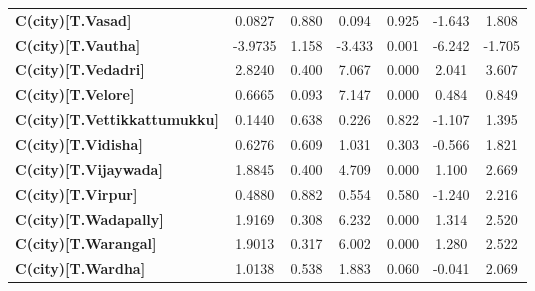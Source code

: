\begin{center}
\begin{tabular}{lcccccc}
\textbf{C(city)[T.Vasad]}                                                                           &       0.0827  &        0.880     &     0.094  &         0.925        &       -1.643    &        1.808     \\
\textbf{C(city)[T.Vautha]}                                                                          &      -3.9735  &        1.158     &    -3.433  &         0.001        &       -6.242    &       -1.705     \\
\textbf{C(city)[T.Vedadri]}                                                                         &       2.8240  &        0.400     &     7.067  &         0.000        &        2.041    &        3.607     \\
\textbf{C(city)[T.Velore]}                                                                          &       0.6665  &        0.093     &     7.147  &         0.000        &        0.484    &        0.849     \\
\textbf{C(city)[T.Vettikkattumukku]}                                                                &       0.1440  &        0.638     &     0.226  &         0.822        &       -1.107    &        1.395     \\
\textbf{C(city)[T.Vidisha]}                                                                         &       0.6276  &        0.609     &     1.031  &         0.303        &       -0.566    &        1.821     \\
\textbf{C(city)[T.Vijaywada]}                                                                       &       1.8845  &        0.400     &     4.709  &         0.000        &        1.100    &        2.669     \\
\textbf{C(city)[T.Virpur]}                                                                          &       0.4880  &        0.882     &     0.554  &         0.580        &       -1.240    &        2.216     \\
\textbf{C(city)[T.Wadapally]}                                                                       &       1.9169  &        0.308     &     6.232  &         0.000        &        1.314    &        2.520     \\
\textbf{C(city)[T.Warangal]}                                                                        &       1.9013  &        0.317     &     6.002  &         0.000        &        1.280    &        2.522     \\
\textbf{C(city)[T.Wardha]}                                                                          &       1.0138  &        0.538     &     1.883  &         0.060        &       -0.041    &        2.069     \\

\end{tabular}
\end{center}
